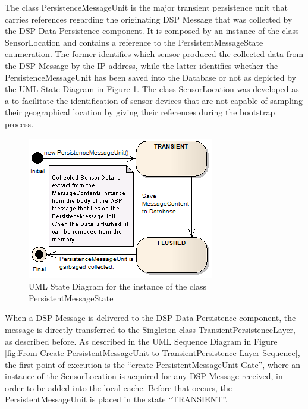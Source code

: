 The class PersistenceMessageUnit is the major transient persistence unit that
carries references regarding the originating DSP Message that was collected by
the DSP Data Persistence component. It is composed by an instance of the class 
SensorLocation and contains a reference to the PersistentMessageState
enumeration. The former identifies which sensor produced the collected data
from the DSP Message by the IP address, while the latter identifies whether
the PersistenceMessageUnit has been saved into the Database or not as depicted
by the UML State Diagram in Figure \ref{fig:PersistentMessageState-Diagram}. 
The class SensorLocation was developed as a to facilitate the identification of
sensor devices that are not capable of sampling their geographical location by
giving their references during the bootstrap process.

\begin{figure}[!h]
  \centering
  \includegraphics[scale=0.65]{../diagrams/PersistentMessageState-Diagram}
  \caption{UML State Diagram for the instance of the class
  PersistentMessageState}
  \label{fig:PersistentMessageState-Diagram}
\end{figure}

When a DSP Message is delivered to the DSP Data Persistence component, the
message is directly transferred to the Singleton class
TransientPersistenceLayer, as described before. As described in the UML
Sequence Diagram in Figure
\ref{fig:From-Create-PersistentMessageUnit-to-TransientPersistence-Layer-Sequence},
the first point of execution is the ``create PersistentMessageUnit Gate'',
where an instance of the SensorLocation is acquired for any DSP Message
received, in order to be added into the local cache. Before that occurs, the
PersistentMessageUnit is placed in the state ``TRANSIENT''.

